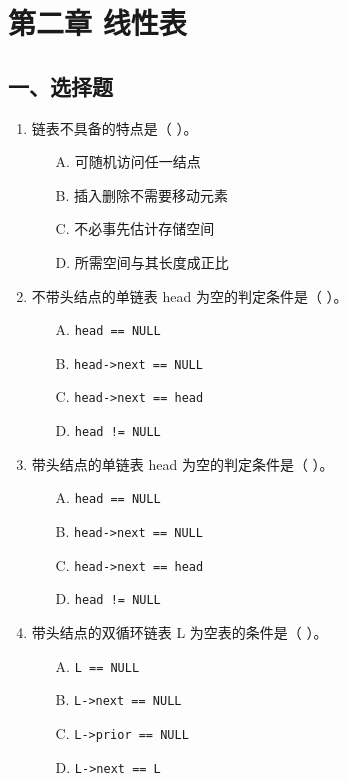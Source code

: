 \documentclass[12pt, a4paper]{article}
\begin{document}
\section{第二章 线性表}

\subsection*{一、选择题}
\begin{enumerate}
    \item 链表不具备的特点是（ ）。
    \begin{enumerate}
        \item[A.] 可随机访问任一结点
        \item[B.] 插入删除不需要移动元素
        \item[C.] 不必事先估计存储空间
        \item[D.] 所需空间与其长度成正比
    \end{enumerate}
    
    \item 不带头结点的单链表 head 为空的判定条件是（ ）。
    \begin{enumerate}
        \item[A.] \texttt{head == NULL}
        \item[B.] \texttt{head->next == NULL}
        \item[C.] \texttt{head->next == head}
        \item[D.] \texttt{head != NULL}
    \end{enumerate}
    
    \item 带头结点的单链表 head 为空的判定条件是（ ）。
    \begin{enumerate}
        \item[A.] \texttt{head == NULL}
        \item[B.] \texttt{head->next == NULL}
        \item[C.] \texttt{head->next == head}
        \item[D.] \texttt{head != NULL}
    \end{enumerate}
    
    \item 带头结点的双循环链表 L 为空表的条件是（ ）。
    \begin{enumerate}
        \item[A.] \texttt{L == NULL}
        \item[B.] \texttt{L->next == NULL}
        \item[C.] \texttt{L->prior == NULL}
        \item[D.] \texttt{L->next == L}
    \end{enumerate}
    

\end{enumerate}
\end{document}
